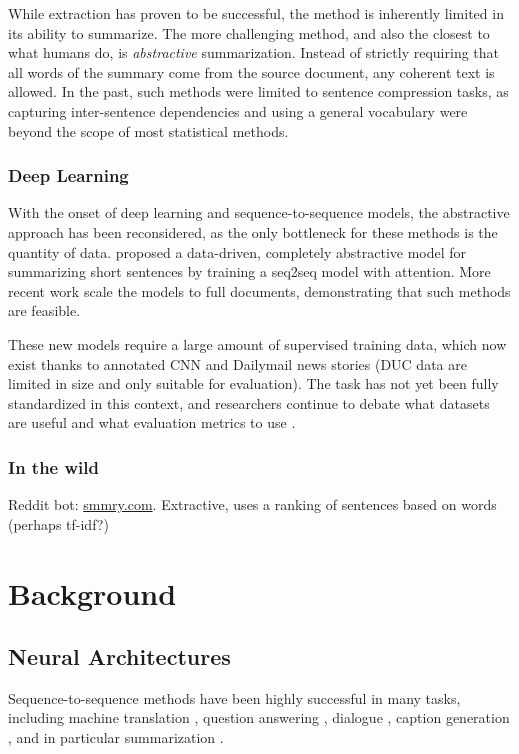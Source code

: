 \documentclass[11pt]{report}
\begin{document}
While extraction has proven to be successful, the method is inherently limited in its ability to summarize. The more challenging method, and also the closest to what humans do, is \emph{abstractive} summarization. Instead of strictly requiring that all words of the summary come from the source document, any coherent text is allowed. In the past, such methods were limited to sentence compression tasks, as capturing inter-sentence dependencies and using a general vocabulary were beyond the scope of most statistical methods.

\subsection{Deep Learning}

With the onset of deep learning and sequence-to-sequence models, the abstractive approach has been reconsidered, as the only bottleneck for these methods is the quantity of data. \cite{rush2015neural} proposed a data-driven, completely abstractive model for summarizing short sentences by training a seq2seq model with attention. More recent work \citep{nallapati2016seq2seq, ramachandran2016} scale the models to full documents, demonstrating that such methods are feasible.

These new models require a large amount of supervised training data, which now exist thanks to annotated CNN and Dailymail news stories (DUC data are limited in size and only suitable for evaluation). The task has not yet been fully standardized in this context, and researchers continue to debate what datasets are useful and what evaluation metrics to use \citep{toutanova2016summarymetrics}. 

\subsection{In the wild}

Reddit bot: \url{smmry.com}. Extractive, uses a ranking of sentences based on words (perhaps tf-idf?)

\chapter{Background}

\section{Neural Architectures}

Sequence-to-sequence methods have been highly successful in many tasks, including machine translation \citep{sutskever2014sequence, bahdanau2014neural}, question answering \citep{hermann2015read}, dialogue \citep{li2016persona}, caption generation \citep{xu2015captioning}, and in particular summarization \citep{rush2015neural}.
\end{document}
